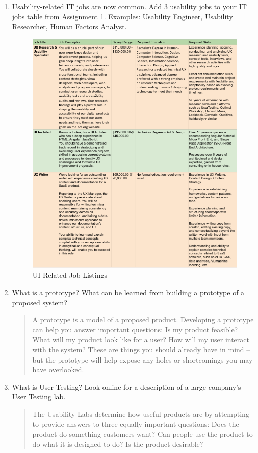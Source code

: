 \documentclass{article}
\begin{document}
\begin{enumerate}
    \newpage
    \item Usability-related IT jobs are now common. Add 3 usability jobs to your IT jobs table from Assignment 1. Examples: Usability Engineer, Usability Researcher, Human Factors Analyst.
    
      \begin{figure}[H]
        \centering
        \includegraphics[width=0.8\linewidth]{images/job_listings.png}
        \caption{UI-Related Job Listings}
      \end{figure}
    \item What is a prototype? What can be learned from building a prototype of a proposed system?

    \begin{quote}
    A prototype is a model of a proposed product. Developing a prototype can help you answer important questions: Is my product feasible? What will my product look like for a user? How will my user interact with the system? These are things you should already have in mind -- but the prototype will help expose any holes or shortcomings you may have overlooked.
    \end{quote}

    \item What is User Testing? Look online for a description of a large company's User Testing lab.

    \begin{quote}
    The Usability Labs determine how useful products are by attempting to provide answers to three equally important questions: Does the product do something customers want? Can people use the product to do what it is designed to do? Is the product desirable?
    \end{quote}


\end{enumerate}
\end{document}
